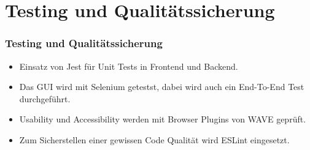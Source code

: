 \section{Testing und Qualitätssicherung}
\begin{frame}
    \frametitle{Testing und Qualitätssicherung}
    \begin{itemize}
        \item Einsatz von Jest für Unit Tests in Frontend und Backend.
        \item Das GUI wird mit Selenium getestst, dabei wird auch ein End-To-End Test durchgeführt.
        \item Usability und Accessibility werden mit Browser Plugins von WAVE geprüft.
        \item Zum Sicherstellen einer gewissen Code Qualität wird ESLint eingesetzt.
    \end{itemize}
\end{frame}